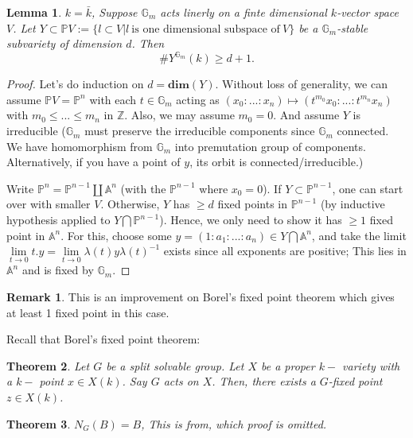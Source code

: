 \documentclass[12pt,a4paper,english]{article}
\theoremstyle{plain}
\newtheorem{thm}{Theorem}[section]
\newtheorem{lem}[thm]{Lemma}
\theoremstyle{definition}
\newtheorem*{rem}{Remark}
\begin{document}
\begin{lem}\label{lem1}
$k=\bar{k}$, Suppose $\mathbb{G}_{m}$ acts linerly on a finte dimensional $k$-vector space $V$. Let $Y\subset \mathbb{P}V:=\{l\subset V| l\ \text{is one dimensional subspace of}\ V\}$ be a $\mathbb{G}_{m}$-stable subvariety of dimension $d$. Then 
\begin{equation*}
    \# Y^{\mathbb{G}_{m}}(k)\geq d+1.
\end{equation*}
\end{lem}
\begin{proof}
Let's do induction on $d=\textbf{dim}(Y)$. Without loss of generality, we can assume $\mathbb{P}V=\mathbb{P}^{n}$ with each $t\in \mathbb{G}_{m}$ acting as $(x_{0}:...:x_{n})\mapsto (t^{m_{0}}x_{0}:...:t^{m_{n}}x_{n})$ with $m_{0}\leq ...\leq m_{n}$ in $\mathbb{Z}$. Also, we may assume $m_{0}=0$. And assume $Y$ is irreducible ($\mathbb{G}_{m}$ must preserve the irreducible components since $\mathbb{G}_{m}$ connected. We have homomorphism from $\mathbb{G}_{m}$ into premutation group of components. Alternatively, if you have a point of $y$, its orbit is connected/irreducible.)

Write $\mathbb{P}^{n}=\mathbb{P}^{n-1}\coprod\mathbb{A}^{n}$ (with the $\mathbb{P}^{n-1}$ where $x_{0}=0$). If $Y\subset \mathbb{P}^{n-1}$, one can start over with smaller $V$. Otherwise, $Y$ has $\geq d$ fixed points in $\mathbb{P}^{n-1}$ (by inductive hypothesis applied to $Y\bigcap\mathbb{P}^{n-1}$). Hence, we only need to show it has $\geq 1$ fixed point in $\mathbb{A}^{n}$. For this, choose some $y=(1:a_{1}:...:a_{n})\in Y\bigcap\mathbb{A}^{n}$, and take the limit $\lim\limits_{t\rightarrow 0}t.y=\lim\limits_{t\rightarrow 0}\lambda(t)y\lambda(t)^{-1}$ exists since all exponents are positive; This lies in $\mathbb{A}^{n}$ and is fixed by $\mathbb{G}_{m}$.
\end{proof}
\begin{rem}
This is an improvement on Borel's fixed point theorem which gives at least 1 fixed point in this case. 

Recall that Borel's fixed point theorem:
\begin{thm}
Let $G$ be a split solvable group. Let $X$ be a proper $k-$ variety with a $k-$ point $x\in X(k)$. Say $G$ acts on $X$. Then, there exists a $G$-fixed point $z\in X(k)$.
\end{thm}
\end{rem}
\begin{thm}
$N_{G}(B)=B$, This is from\cite{milneiAG}, which proof is omitted. 
\end{thm}
\end{document}

